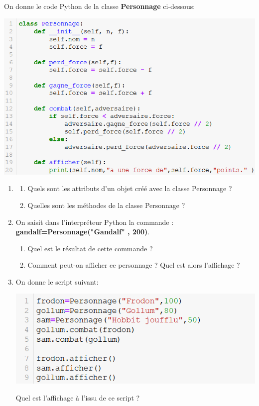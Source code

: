 \documentclass[11pt,a4paper]{article}
\newcounter{num}
\begin{document}
On donne le code Python de la classe \textbf{Personnage} ci-dessous:
\begin{center}
\includegraphics[scale=0.7]{../img/class_personnage.png}
\end{center}
\begin{enumerate}
\item \begin{enumerate}
\item Quels sont les attributs d'un objet créé avec la classe Personnage ?
\item Quelles sont les méthodes de la classe Personnage ?
\end{enumerate}
\item On saisit dans l'interpréteur Python la commande : \textbf{gandalf=Personnage("Gandalf" , 200)}.
\begin{enumerate}
\item Quel est le résultat de cette commande ?
\item Comment peut-on afficher ce personnage ? Quel est alors l'affichage ?
\end{enumerate}
\item On donne le script suivant:
\begin{center}
\includegraphics[scale=0.7]{../img/objet_personnage.png}
\end{center}
Quel est l'affichage à l'issu de ce script ?
\end{enumerate}
\end{document}
